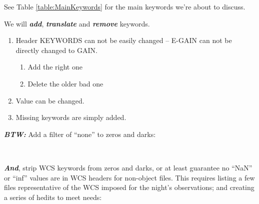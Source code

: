  

See Table \ref{table:MainKeywords} for the main keywords we're about to discuss.

We will \textbf{\emph{add}}, \textbf{\emph{translate}} and \textbf{\emph{remove}} keywords.

\vspace{-.15cm}
\begin{enumerate}[resume]\addtolength{\itemsep}{-0.5\baselineskip}
   \item   Header KEYWORDS can not be easily changed -- E-GAIN can not be directly changed to GAIN.
\begin{enumerate}\addtolength{\itemsep}{-0.5\baselineskip}
   \item   Add the right one
   \item   Delete the older bad one
\end{enumerate}
   \item   Value can be changed.
   \item   Missing keywords are simply added.
\end{enumerate}



\textbf{\emph{BTW:}} Add a filter of ``none'' to zeros and darks:

{\color{verbcolor}{\verb#hselect *fits $I "(IMAGETYP ?= 'dark' || IMAGETYP ?= 'zero')" > l.l#}} \\
{\color{verbcolor}{\verb#hedit @l.l FILTER none add+ update+ del- ver- show-#}}

\textbf{\emph{And}}, strip WCS keywords from zeros and darks, or at
least guarantee no ``NaN'' or ``inf'' values are in WCS headers for
non-object files. This requires listing a few files representative of
the WCS imposed for the night's observations; and creating a series of
hedits to meet needs:

{\color{verbcolor}{\verb#hedit wildcard Comma-Keyword-List del+ ver- show- update+#}}

